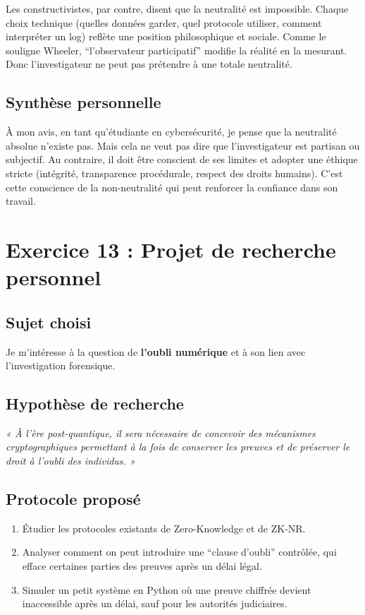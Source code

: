 \documentclass[12pt,a4paper]{report}
\begin{document}
	Les constructivistes, par contre, disent que la neutralité est impossible. 
	Chaque choix technique (quelles données garder, quel protocole utiliser, 
	comment interpréter un log) reflète une position philosophique et sociale. 
	Comme le souligne Wheeler, ``l’observateur participatif'' modifie la réalité en la mesurant. 
	Donc l’investigateur ne peut pas prétendre à une totale neutralité.
	
	\subsection*{Synthèse personnelle}
	
	À mon avis, en tant qu’étudiante en cybersécurité, je pense que la neutralité absolue 
	n’existe pas. Mais cela ne veut pas dire que l’investigateur est partisan ou subjectif. 
	Au contraire, il doit être conscient de ses limites et adopter une éthique stricte 
	(intégrité, transparence procédurale, respect des droits humains). 
	C’est cette conscience de la non-neutralité qui peut renforcer la confiance dans son travail.
	
	\newpage
	\section*{Exercice 13 : Projet de recherche personnel}
	
	\subsection*{Sujet choisi}
	
	Je m’intéresse à la question de \textbf{l’oubli numérique} et à son lien avec 
	l’investigation forensique.
	
	\subsection*{Hypothèse de recherche}
	
	\textit{« À l’ère post-quantique, il sera nécessaire de concevoir des mécanismes 
		cryptographiques permettant à la fois de conserver les preuves et de préserver 
		le droit à l’oubli des individus. »}
	
	\subsection*{Protocole proposé}
	
	\begin{enumerate}
		\item Étudier les protocoles existants de Zero-Knowledge et de ZK-NR.
		\item Analyser comment on peut introduire une ``clause d’oubli'' contrôlée, 
		qui efface certaines parties des preuves après un délai légal.
		\item Simuler un petit système en Python où une preuve chiffrée devient 
		inaccessible après un délai, sauf pour les autorités judiciaires.
	\end{enumerate}
	
\end{document}
